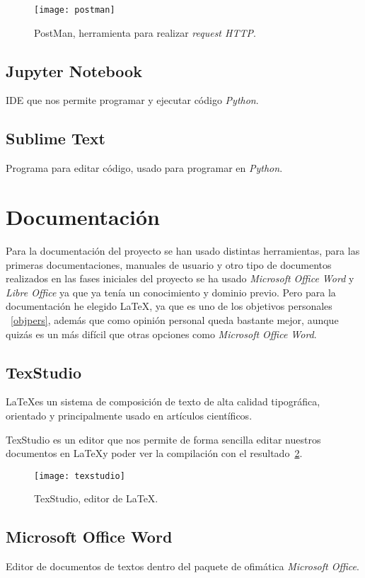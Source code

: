 \begin{figure}
	\centering
	\texttt{[image: postman]}
	\caption{PostMan, herramienta para realizar \textit{request HTTP}.}
	\label{fig:postman}
\end{figure}
\subsection{Jupyter Notebook}
IDE que nos permite programar y ejecutar código \textit{Python}.
\subsection{Sublime Text}
Programa para editar código, usado para programar en \textit{Python}.
\section{Documentación}
Para la documentación del proyecto se han usado distintas herramientas, para las primeras documentaciones, manuales de usuario y otro tipo de documentos realizados en las fases iniciales del proyecto se ha usado \textit{Microsoft Office Word} y \textit{Libre Office} ya que ya tenía un conocimiento y dominio previo. Pero para la documentación he elegido \LaTeX, ya que es uno de los objetivos personales ~\ref{objpers}, además que como opinión personal queda bastante mejor, aunque quizás es un más difícil que otras opciones como \textit{Microsoft Office Word}.
\subsection{TexStudio}
\LaTeX es un sistema de composición de texto de alta calidad tipográfica, orientado y principalmente usado en artículos científicos.

TexStudio es un editor que nos permite de forma sencilla editar nuestros documentos en \LaTeX y poder ver la compilación con el resultado~\ref{fig:texstudio}.

\begin{figure}
	\centering
	\texttt{[image: texstudio]}
	\caption{TexStudio, editor de \LaTeX.}
	\label{fig:texstudio}
\end{figure}

\subsection{Microsoft Office Word}
Editor de documentos de textos dentro del paquete de ofimática \textit{Microsoft Office}.
